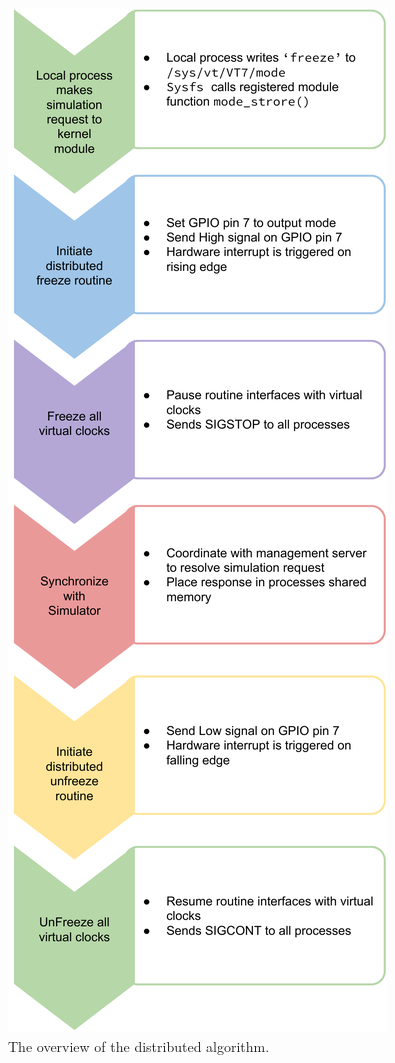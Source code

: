 \begin{figure}
  \centering
  \includegraphics[scale=0.48]{Distributed_Algo.pdf}
  \caption{
    The overview of the distributed algorithm.
    }
\end{figure}

